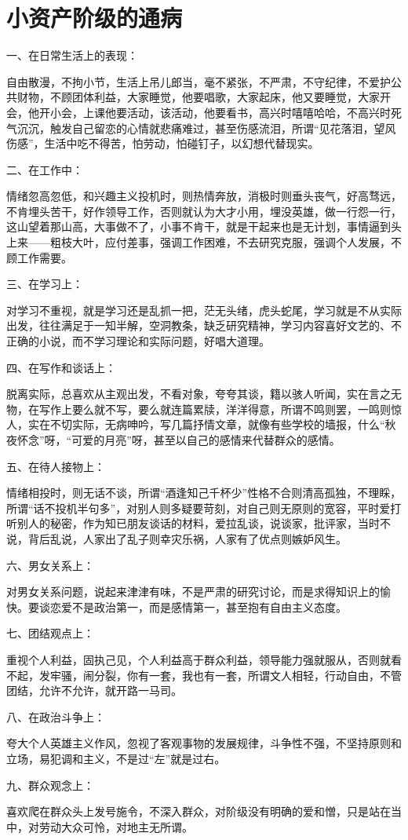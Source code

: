 \section[小资产阶级的通病 ]{小资产阶级的通病}

一、在日常生活上的表现：

自由散漫，不拘小节，生活上吊儿郎当，毫不紧张，不严肃，不守纪律，不爱护公共财物，不顾团体利益，大家睡觉，他要唱歌，大家起床，他又要睡觉，大家开会，他开小会，上课他要活动，该活动，他要看书，高兴时嘻嘻哈哈，不高兴时死气沉沉，触发自己留恋的心情就悲痛难过，甚至伤感流泪，所谓“见花落泪，望风伤感”，生活中吃不得苦，怕劳动，怕碰钉子，以幻想代替现实。

二、在工作中：

情绪忽高忽低，和兴趣主义投机时，则热情奔放，消极时则垂头丧气，好高骛远，不肯埋头苦干，好作领导工作，否则就认为大才小用，埋没英雄，做一行怨一行，这山望着那山高，大事做不了，小事不肯干，就是干起来也是无计划，事情逼到头上来——粗枝大叶，应付差事，强调工作困难，不去研究克服，强调个人发展，不顾工作需要。

三、在学习上：

对学习不重视，就是学习还是乱抓一把，茫无头绪，虎头蛇尾，学习就是不从实际出发，往往满足于一知半解，空洞教条，缺乏研究精神，学习内容喜好文艺的、不正确的小说，而不学习理论和实际问题，好唱大道理。

四、在写作和谈话上：

脱离实际，总喜欢从主观出发，不看对象，夸夸其谈，籍以骇人听闻，实在言之无物，在写作上要么就不写，要么就连篇累牍，洋洋得意，所谓不鸣则罢，一鸣则惊人，实在不切实际，无病呻吟，写几篇抒情文章，就像有些学校的墙报，什么“秋夜怀念”呀，“可爱的月亮”呀，甚至以自己的感情来代替群众的感情。

五、在待人接物上：

情绪相投时，则无话不谈，所谓“酒逢知己千杯少”性格不合则清高孤独，不理睬，所谓“话不投机半句多”，对别人则多疑要苛刻，对自己则无原则的宽容，平时爱打听别人的秘密，作为知已朋友谈话的材料，爱拉乱谈，说谈家，批评家，当时不说，背后乱说，人家出了乱子则幸灾乐祸，人家有了优点则嫉妒风生。

六、男女关系上：

对男女关系问题，说起来津津有味，不是严肃的研究讨论，而是求得知识上的愉快。要谈恋爱不是政治第一，而是感情第一，甚至抱有自由主义态度。

七、团结观点上：

重视个人利益，固执己见，个人利益高于群众利益，领导能力强就服从，否则就看不起，发牢骚，闹分裂，你有一套，我也有一套，所谓文人相轻，行动自由，不管团结，允许不允许，就开路一马司。

八、在政治斗争上：

夸大个人英雄主义作风，忽视了客观事物的发展规律，斗争性不强，不坚持原则和立场，易犯调和主义，不是过“左”就是过右。

九、群众观念上：

喜欢爬在群众头上发号施令，不深入群众，对阶级没有明确的爱和憎，只是站在当中，对劳动大众可怜，对地主无所谓。

